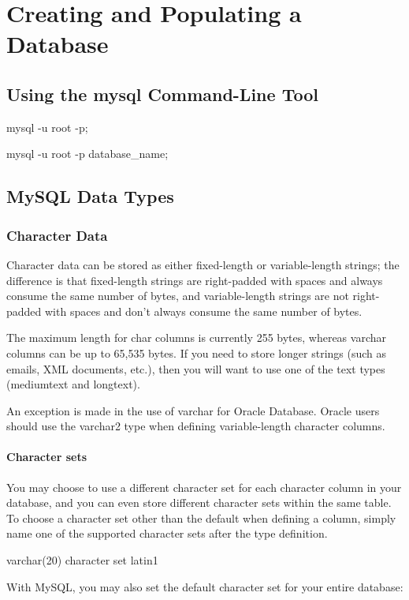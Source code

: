 \chapter{Creating and Populating a Database\label{Ch02}}
\section{Using the mysql Command-Line Tool}
\textsf{mysql -u root -p;}

\textsf{mysql -u root -p database\_name;}
\section{MySQL Data Types}
\subsection{Character Data}
Character data can be stored as either fixed-length or variable-length strings; the difference is that fixed-length strings are right-padded with spaces and always consume the same number of bytes, and variable-length strings are not right-padded with spaces and don't always consume the same number of bytes.

The maximum length for char columns is currently 255 bytes, whereas varchar columns can be up to 65,535 bytes. If you need to store longer strings (such as emails,
XML documents, etc.), then you will want to use one of the text types (mediumtext
and longtext).

\begin{tcolorbox}
    An exception is made in the use of varchar for Oracle Database. Oracle users should use the varchar2 type when defining variable-length character columns.
\end{tcolorbox}

\subsubsection*{Character sets}

You may choose to use a different character set for each character column in your database, and you can even store different character sets within the same table. To choose a character set other than the default when defining a column, simply name one of the supported character sets after the type definition.

\textsf{varchar(20) character set latin1}

With MySQL, you may also set the default character set for your entire database:

